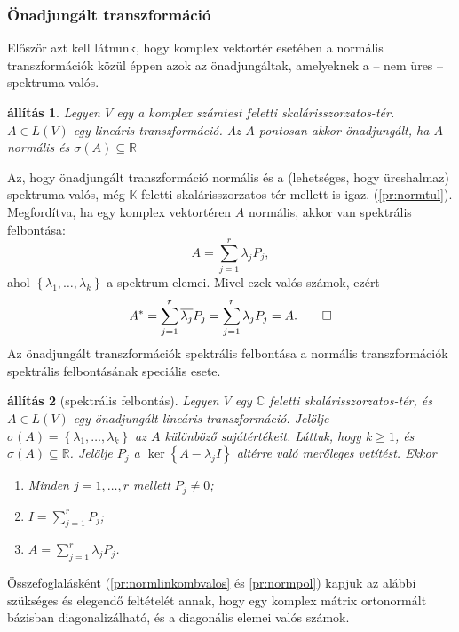 \documentclass[9pt, a4paper, showtrims]{memoir}
\makeatletter
\renewenvironment{proof}[1][\proofname]
    {\par\pushQED{\qed}%
    \normalfont \topsep6\p@\@plus6\p@\relax
    \trivlist
    \item[\hskip\labelsep
        \itshape
    #1\@addpunct{:}]\ignorespaces}
    {\popQED\endtrivlist\@endpefalse}
\theoremstyle{plain}
\newtheorem{proposition}{állítás}[chapter]
\theoremstyle{remark}
\theoremstyle{definition}
\makeatother
\begin{document}
\subsubsection{Önadjungált transzformáció}
Először azt kell látnunk,
hogy komplex vektortér esetében a normális transzformációk közül éppen azok az önadjungáltak,
amelyeknek a -- nem üres -- spektruma valós.
\begin{proposition}
	Legyen $V$ egy a komplex számtest feletti skalárisszorzatos-tér.
	$A\in L\left( V \right)$ egy lineáris transzformáció.
	Az $A$ pontosan akkor önadjungált, ha $A$ normális és $\sigma\left( A \right)\subseteq\mathbb{R}$
\end{proposition}
\begin{proof}
	Az, hogy önadjungált transzformáció normális és a (lehetséges, hogy üreshalmaz) spektruma valós,
	még $\mathbb{K}$ feletti skalárisszorzatos-tér mellett is igaz. (\ref{pr:normtul}).
	Megfordítva,
	ha egy komplex vektortéren $A$ normális, akkor van spektrális felbontása:
	\[
		A=\sum_{j=1}^r\lambda_jP_j,
	\]
	ahol $\left\{ \lambda_1,\ldots,\lambda_k \right\}$ a spektrum elemei.
	Mivel ezek valós számok,
	ezért
	\[
		A^\ast=\sum_{j=1}^r\overline{\lambda_j}P_j=
		\sum_{j=1}^r\lambda_jP_j=A.
		\qedhere
	\]
\end{proof}
Az önadjungált transzformációk spektrális felbontása
a normális transzformációk spektrális felbontásának speciális esete.
\begin{proposition}[spektrális felbontás]
	Legyen $V$ egy $\mathbb{C}$ feletti skalárisszorzatos-tér, és $A\in L\left( V \right)$
	egy önadjungált lineáris transzformáció.
	Jelölje $\sigma\left( A \right)=\left\{\lambda_1,\ldots,\lambda_k  \right\}$ az $A$ különböző sajátértékeit.
	Láttuk, hogy $k\geq 1$, és $\sigma\left( A \right)\subseteq \mathbb{R}$.
	Jelölje $P_j$ a $\ker\left\{ A-\lambda_jI \right\}$ altérre való merőleges vetítést.
	Ekkor
	\begin{enumerate}
		\item Minden $j=1,\ldots,r$ mellett $P_j\neq 0$;
		\item $I=\sum_{j=1}^rP_j$;
		\item $A=\sum_{j=1}^r\lambda_jP_j$.
		      \qedhere
	\end{enumerate}
\end{proposition}
Összefoglalásként (\ref{pr:normlinkombvalos} és \ref{pr:normpol}) kapjuk az alábbi szükséges és elegendő feltételét annak,
hogy egy komplex mátrix ortonormált bázisban diagonalizálható, és a diagonális elemei valós számok.
\end{document}
